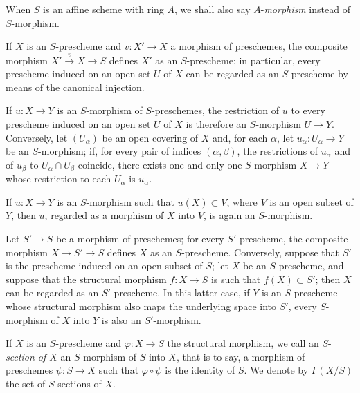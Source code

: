 When $S$ is an affine scheme with ring $A$, we shall also say
$A$-\emph{morphism} instead of $S$-morphism.

\begin{env}[2.5.3]
\label{I.2.5.3}
If $X$ is an $S$-prescheme and $v:X'\to X$ a morphism of preschemes, the
composite morphism $X'\xrightarrow{v}X\to S$ defines $X'$ as an
$S$-prescheme; in particular, every prescheme induced on an open set $U$ of
$X$ can be regarded as an $S$-prescheme by means of the canonical
injection.

If $u:X\to Y$ is an $S$-morphism of $S$-preschemes, the restriction of $u$
to every prescheme induced on an open set $U$ of $X$ is therefore an
$S$-morphism $U\to Y$. Conversely, let $(U_\alpha)$ be an open covering of
$X$ and, for each $\alpha$, let $u_\alpha:U_\alpha\to Y$ be an $S$-morphism;
if, for every pair of indices $(\alpha,\beta)$, the restrictions of
$u_\alpha$ and of $u_\beta$ to $U_\alpha\cap U_\beta$ coincide, there exists
one and only one $S$-morphism $X\to Y$ whose restriction to each $U_\alpha$
is $u_\alpha$.

If $u:X\to Y$ is an $S$-morphism such that $u(X)\subset V$, where $V$ is an
open subset of $Y$, then $u$, regarded as a morphism of $X$ into $V$, is
again an $S$-morphism.
\end{env}

\begin{env}[2.5.4]
\label{I.2.5.4}
Let $S'\to S$ be a morphism of preschemes; for every $S'$-prescheme, the
composite morphism $X\to S'\to S$ defines $X$ as an $S$-prescheme.
Conversely, suppose that $S'$ is the prescheme induced on an open subset of
$S$; let $X$ be an $S$-prescheme, and suppose that the structural morphism
$f:X\to S$ is such that $f(X)\subset S'$; then $X$ can be regarded as an
$S'$-prescheme. In this latter case, if $Y$ is an $S$-prescheme whose
structural morphism also maps the underlying space into $S'$, every
$S$-morphism of $X$ into $Y$ is also an $S'$-morphism.
\end{env}

\begin{env}[2.5.5]
\label{I.2.5.5}
If $X$ is an $S$-prescheme and $\varphi:X\to S$ the structural morphism, we
call an $S$-\emph{section of $X$} an $S$-morphism of $S$ into $X$, that is
to say, a morphism of preschemes $\psi:S\to X$ such that
$\varphi\circ\psi$ is the identity of $S$. We denote by $\Gamma(X/S)$
the set of $S$-sections of $X$.
\end{env}
